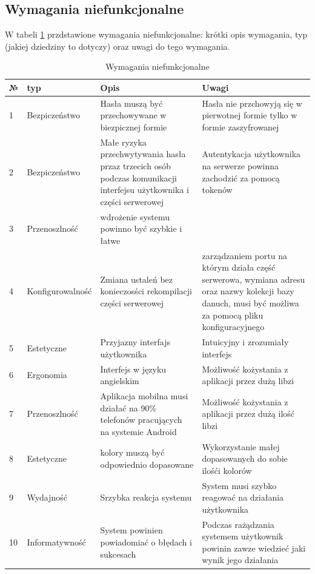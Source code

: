 \subsection{Wymagania niefunkcjonalne}
W tabeli \ref{tab:wymaganianiefunkcjonalne} przdstawione wymagania niefunkcjonalne: krótki opis wymagania, typ (jakiej dziedziny to dotyczy) oraz uwagi do tego wymagania.
\begin{table}[htb] \small
    \caption{Wymagania niefunkcjonalne}
    \label{tab:wymaganianiefunkcjonalne}
    \begin{tabular}{| m{0.5cm} | m{3cm} | m{5.75cm} | m{5.75cm} |} 
    \hline
    № & typ & Opis & Uwagi \\
    \hline
    1 & Bezpiczeństwo & Hasła muszą być przechowywane w biezpicznej formie & Hasła nie przchowyją się w pierwotnej formie tylko w formie zaszyfrowanej \\ 
    \hline
    2 & Bezpiczeństwo & Małe ryzyka przechwytywania hasła przaz trzecich osób podczas komunikacji interfejsu użytkownika i części serwerowej & Autentykacja użytkownika na serwerze powinna zachodzić za pomocą tokenów \\ 
    \hline
    3 & Przenoszlność & wdrożenie systemu powinno być szybkie i łatwe & \\ 
    \hline
    4 & Konfigurowalność & Zmiana ustaleń bez konieczosści rekompilacji części serwerowej & zarządzaniem portu na którym działa część serwerowa, wymiana adresu oraz nazwy kolekcji bazy danuch, musi być możliwa za pomocą pliku konfiguracyjnego \\ 
    \hline
    5 & Estetyczne & Przyjazny interfajs użytkownika & Intuicyjny i zrozumiały interfejs \\ 
    \hline
    6 & Ergonomia & Interfejs w języku angielskim & Możliwość kożystania z aplikacji przez dużą libzi \\
    \hline
    7 & Przenoszlność & Aplikacja mobilna musi działać na 90\% telefonów pracujących na systemie Android & Możliwość kożystania z aplikacji przez dużą ilość libzi \\
    \hline
    8 & Estetyczne & kolory muszą być odpowiednio dopasowane & Wykorzystanie małej dopasowanych do sobie ilośći kolorów  \\
    \hline
    9 & Wydajność & Srzybka reakcja systemu & System musi szybko reagować na działania użytkownika \\
    \hline
    10 & Informatywność & System powinien powiadomiać o błędach i sukcesach  & Podczas rażądzania systemem użytkownik powinin zawze wiedzieć jaki wynik jego działania \\

\end{tabular}
\end{table}
